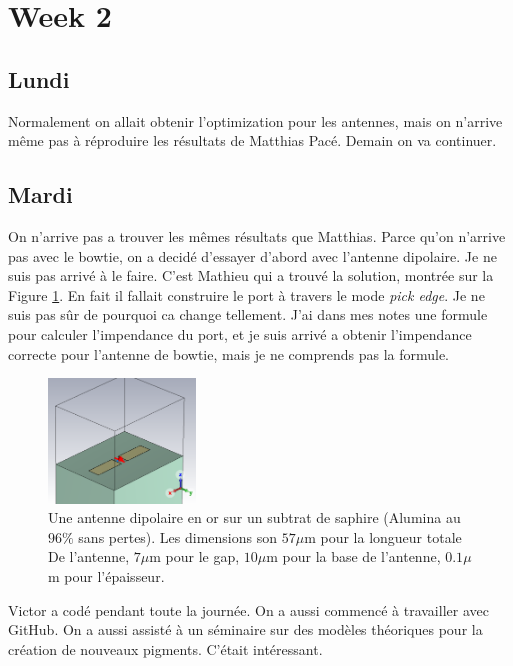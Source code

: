 \section{Week 2}

\subsection{Lundi}

Normalement on allait obtenir l'optimization pour les antennes, mais on n'arrive même pas à
réproduire les résultats de Matthias Pacé. Demain on va continuer.

\subsection{Mardi}

On n'arrive pas a trouver les mêmes résultats que Matthias. Parce qu'on n'arrive pas avec le bowtie, on a
decidé d'essayer d'abord avec l'antenne dipolaire. Je ne suis pas arrivé à le faire. C'est Mathieu qui a 
trouvé la solution, montrée sur la Figure \ref{fig:first_dipole}. En fait il fallait construire le port à 
travers le mode \textit{pick edge}. Je ne suis pas sûr de pourquoi ca change tellement.
J'ai dans mes notes une formule pour calculer l'impendance du port, et je suis arrivé a obtenir l'impendance
correcte pour l'antenne de bowtie, mais je ne comprends pas la formule.

\begin{figure}
    \centering
    \includegraphics[width=0.35\textwidth]{texfigures/first_dipole.png}
    \caption{\label{fig:first_dipole} Une antenne dipolaire en or sur un subtrat de saphire 
    (Alumina au $96\%$ sans pertes). Les dimensions son $57\mu $m pour la longueur totale De
    l'antenne, $7\mu $m pour le gap, $10\mu $m pour la base de l'antenne, $0.1\mu $m pour l'épaisseur.}
\end{figure}

Victor a codé pendant toute la journée. On a aussi commencé à travailler avec GitHub. On a aussi assisté
à un séminaire sur des modèles théoriques pour la création de nouveaux pigments. C'était intéressant.